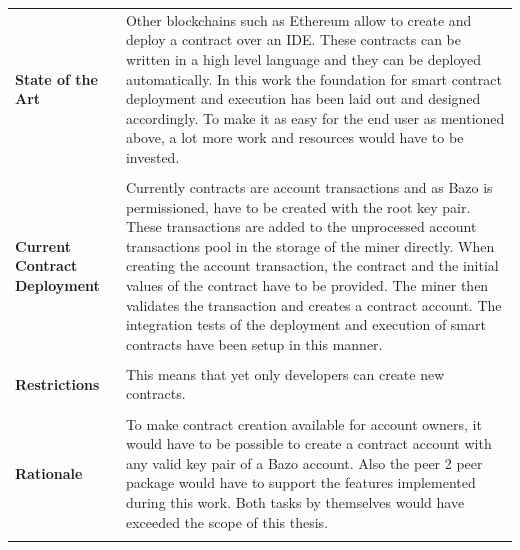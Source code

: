 \begin{tabular}[t]{ p{3cm} p{12.5cm}}
\raggedright
\textbf{State of the Art} &
Other blockchains such as Ethereum allow to create and deploy a contract over an IDE. These contracts can be written in a high level language and they can be deployed automatically. In this work the foundation for smart contract deployment and execution has been laid out and designed accordingly. To make it as easy for the end user as mentioned above, a lot more work and resources would have to be invested. \\ \\

\raggedright
\textbf{Current Contract Deployment} &
Currently contracts are account transactions and as Bazo is permissioned, have to be created with the root key pair. These transactions are added to the unprocessed account transactions pool in the storage of the miner directly. When creating the account transaction, the contract and the initial values of the contract have to be provided. The miner then validates the transaction and creates a contract account. The integration tests of the deployment and execution of smart contracts have been setup in this manner.  \\ \\

\raggedright
\textbf{Restrictions} &
This means that yet only developers can create new contracts. \\ \\

\raggedright
\textbf{Rationale} &
To make contract creation available for account owners, it would have to be possible to create a contract account with any valid key pair of a Bazo account. Also the peer 2 peer package would have to support the features implemented during this work.
Both tasks by themselves would have exceeded the scope of this thesis. \\ \\
\end{tabular}

